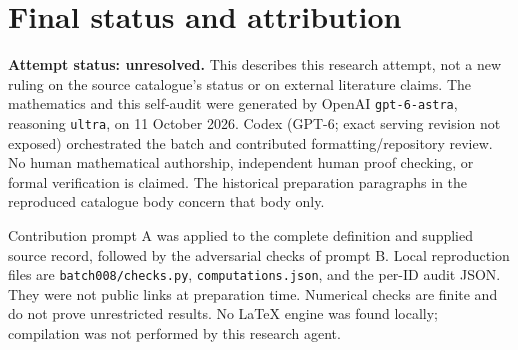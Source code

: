 \documentclass[11pt]{article}
\begin{document}
\section{Final status and attribution}
\textbf{Attempt status: unresolved.} This describes this research attempt, not a new ruling on the source catalogue's status or on external literature claims.
The mathematics and this self-audit were generated by OpenAI \texttt{gpt-6-astra}, reasoning \texttt{ultra}, on 11 October 2026. Codex (GPT-6; exact serving revision not exposed) orchestrated the batch and contributed formatting/repository review. No human mathematical authorship, independent human proof checking, or formal verification is claimed. The historical preparation paragraphs in the reproduced catalogue body concern that body only.

Contribution prompt A was applied to the complete definition and supplied source record, followed by the adversarial checks of prompt B. Local reproduction files are \texttt{batch008/checks.py}, \texttt{computations.json}, and the per-ID audit JSON. They were not public links at preparation time. Numerical checks are finite and do not prove unrestricted results. No LaTeX engine was found locally; compilation was not performed by this research agent.
\end{document}
